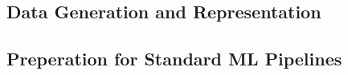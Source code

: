 




\subsection{Data Generation and Representation}
\label{ml:approach:subsec1}


\subsection{Preperation for Standard ML Pipelines}
\label{ml:approach:subsec2}
